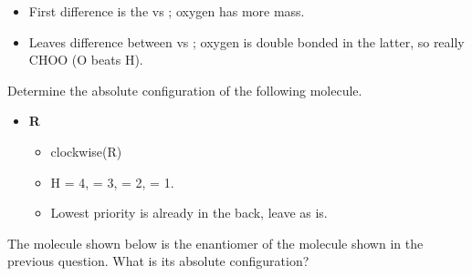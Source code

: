 \documentclass[12pt,a4paper]{article}
\begin{document}
\begin{enumerate}
\begin{itemize}
\begin{itemize}
\begin{itemize}
                    \end{itemize}
                \item First difference is the  vs ; oxygen has more mass.
                \item Leaves difference between  vs ; oxygen is double bonded in the latter, so really {CHOO} (O beats H).
            \end{itemize}
        \end{itemize}
    {\color{G-Moon}\item Determine the absolute configuration of the following molecule.
    
    
    }
        \begin{itemize}
            \item {\color{o-Sun}\textbf{R}}
            \begin{itemize}
                \item {\color{true}\hspace*{20pt} clockwise(R)}
                \item H = 4,  = 3,  = 2,  = 1.
                \item Lowest priority is already in the back, leave as is.
            \end{itemize}
        \end{itemize}
    {\color{G-Moon}\item The molecule shown below is the enantiomer of the molecule shown in the previous question.  What is its absolute configuration?
    
}
\end{enumerate}
\end{document}
